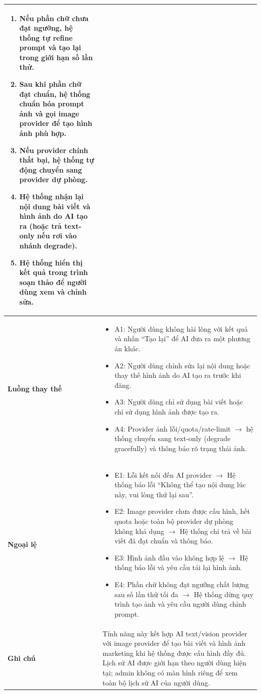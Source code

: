 \begin{longtable}{|p{3.5cm}|p{11cm}|}
\begin{enumerate}
    \item Nếu phần chữ chưa đạt ngưỡng, hệ thống tự refine prompt và tạo lại trong giới hạn số lần thử.
    \item Sau khi phần chữ đạt chuẩn, hệ thống chuẩn hóa prompt ảnh và gọi image provider để tạo hình ảnh phù hợp.
    \item Nếu provider chính thất bại, hệ thống tự động chuyển sang provider dự phòng.
    \item Hệ thống nhận lại nội dung bài viết và hình ảnh do AI tạo ra (hoặc trả text-only nếu rơi vào nhánh degrade).
    \item Hệ thống hiển thị kết quả trong trình soạn thảo để người dùng xem và chỉnh sửa.
\end{enumerate} \\ \hline
\textbf{Luồng thay thế} & 
\begin{itemize}
    \item A1: Người dùng không hài lòng với kết quả và nhấn ``Tạo lại'' để AI đưa ra một phương án khác.
    \item A2: Người dùng chỉnh sửa lại nội dung hoặc thay thế hình ảnh do AI tạo ra trước khi đăng.
    \item A3: Người dùng chỉ sử dụng bài viết hoặc chỉ sử dụng hình ảnh được tạo ra.
    \item A4: Provider ảnh lỗi/quota/rate-limit $\rightarrow$ hệ thống chuyển sang text-only (degrade gracefully) và thông báo rõ trạng thái ảnh.
\end{itemize} \\ \hline
\textbf{Ngoại lệ} & 
\begin{itemize}
    \item E1: Lỗi kết nối đến AI provider $\rightarrow$ Hệ thống báo lỗi ``Không thể tạo nội dung lúc này, vui lòng thử lại sau''.
    \item E2: Image provider chưa được cấu hình, hết quota hoặc toàn bộ provider dự phòng không khả dụng $\rightarrow$ Hệ thống chỉ trả về bài viết đã đạt chuẩn và thông báo.
    \item E3: Hình ảnh đầu vào không hợp lệ $\rightarrow$ Hệ thống báo lỗi và yêu cầu tải lại hình ảnh.
    \item E4: Phần chữ không đạt ngưỡng chất lượng sau số lần thử tối đa $\rightarrow$ Hệ thống dừng quy trình tạo ảnh và yêu cầu người dùng chỉnh prompt.
\end{itemize} \\ \hline
\textbf{Ghi chú} & Tính năng này kết hợp AI text/vision provider với image provider để tạo bài viết và hình ảnh marketing khi hệ thống được cấu hình đầy đủ. Lịch sử AI được giới hạn theo người dùng hiện tại; admin không có màn hình riêng để xem toàn bộ lịch sử AI của người dùng. \\ \hline
\end{longtable}
\endgroup

